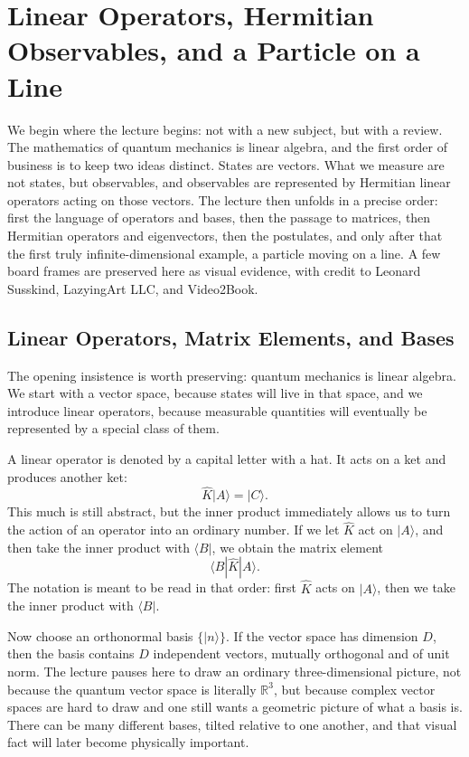 \chapter{Linear Operators, Hermitian Observables, and a Particle on a Line}

We begin where the lecture begins: not with a new subject, but with a review. The mathematics of quantum mechanics is linear algebra, and the first order of business is to keep two ideas distinct. States are vectors. What we measure are not states, but observables, and observables are represented by Hermitian linear operators acting on those vectors. The lecture then unfolds in a precise order: first the language of operators and bases, then the passage to matrices, then Hermitian operators and eigenvectors, then the postulates, and only after that the first truly infinite-dimensional example, a particle moving on a line. A few board frames are preserved here as visual evidence, with credit to Leonard Susskind, LazyingArt LLC, and Video2Book.

\section{Linear Operators, Matrix Elements, and Bases}

The opening insistence is worth preserving: quantum mechanics is linear algebra. We start with a vector space, because states will live in that space, and we introduce linear operators, because measurable quantities will eventually be represented by a special class of them.

A linear operator is denoted by a capital letter with a hat. It acts on a ket and produces another ket:
\begin{equation}
\hat K|A\rangle = |C\rangle.
\end{equation}
This much is still abstract, but the inner product immediately allows us to turn the action of an operator into an ordinary number. If we let \(\hat K\) act on \(|A\rangle\), and then take the inner product with \(\langle B|\), we obtain the matrix element
\begin{equation}
\langle B|\hat K|A\rangle.
\end{equation}
The notation is meant to be read in that order: first \(\hat K\) acts on \(|A\rangle\), then we take the inner product with \(\langle B|\).

Now choose an orthonormal basis \(\{|n\rangle\}\). If the vector space has dimension \(D\), then the basis contains \(D\) independent vectors, mutually orthogonal and of unit norm. The lecture pauses here to draw an ordinary three-dimensional picture, not because the quantum vector space is literally \(\mathbb{R}^3\), but because complex vector spaces are hard to draw and one still wants a geometric picture of what a basis is. There can be many different bases, tilted relative to one another, and that visual fact will later become physically important.


